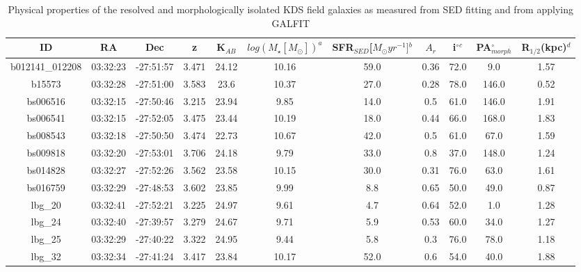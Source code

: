 \documentclass[fleqn,usenatbib]{mn2e}
\begin{document}
\begin{table*}
\centering
\begin{threeparttable}
\caption{Physical properties of the resolved and morphologically isolated KDS field galaxies as measured from SED fitting and from applying GALFIT \protect\citep{Peng2010_galfit}}
\label{tab:phys-props}
\begin{tabular}{ccccccccccc}


 \hline
ID              & RA       & Dec       & z     & K$_{AB}$     & $log(M_{\star}[M_{\odot}])^{a}$ & SFR$_{SED}$[$M_{\odot}yr^{-1}]$$^{b}$ & $A_{r}$ & i$^{\circ}$$^{c}$ & PA$_{morph}^{\circ}$ & R$_{1/2}$(kpc)$^{d}$ \\
 \hline
b012141\_012208 & 03:32:23 & -27:51:57 & 3.471        & 24.12  & 10.16 & 59.0 & 0.36        & 72.0        & 9.0     & 1.57      \\
b15573          & 03:32:28 & -27:51:00 & 3.583        & 23.6   & 10.37 & 27.0 & 0.28        & 78.0        & 146.0   & 0.52      \\
bs006516        & 03:32:15 & -27:50:46 & 3.215        & 23.94  & 9.85  & 14.0 & 0.5         & 61.0        & 146.0   & 1.91      \\
bs006541        & 03:32:15 & -27:52:05 & 3.475       & 23.44  & 10.19 & 18.0 & 0.44        & 66.0        & 168.0   & 1.83      \\
bs008543        & 03:32:18 & -27:50:50 & 3.474        & 22.73  & 10.67 & 42.0 & 0.5         & 61.0        & 67.0    & 1.59      \\
bs009818        & 03:32:20 & -27:53:01 & 3.706        & 24.18  & 9.79  & 33.0 & 0.8         & 37.0        & 148.0   & 1.24      \\
bs014828        & 03:32:27 & -27:52:26 & 3.562        & 23.58  & 10.15 & 30.0 & 0.31        & 76.0        & 63.0    & 1.61      \\
bs016759        & 03:32:29 & -27:48:53 & 3.602       & 23.85  & 9.99  & 8.8  & 0.65        & 50.0        & 49.0    & 0.87      \\
lbg\_20         & 03:32:41 & -27:52:21 & 3.225        & 24.97  & 9.61  & 4.7  & 0.64        & 52.0        & 1.0     & 1.28      \\
lbg\_24         & 03:32:40 & -27:39:57 & 3.279       & 24.67  & 9.71  & 5.9  & 0.53        & 60.0        & 34.0    & 1.27      \\
lbg\_25         & 03:32:29 & -27:40:22 & 3.322        & 24.95  & 9.44  & 5.8  & 0.3         & 76.0        & 78.0    & 1.18      \\
lbg\_32         & 03:32:34 & -27:41:24 & 3.417      & 23.84  & 10.17 & 52.0 & 0.6         & 54.0        & 40.0    & 1.88      \\

\end{tabular}
\end{threeparttable}
\end{table*}
\end{document}
